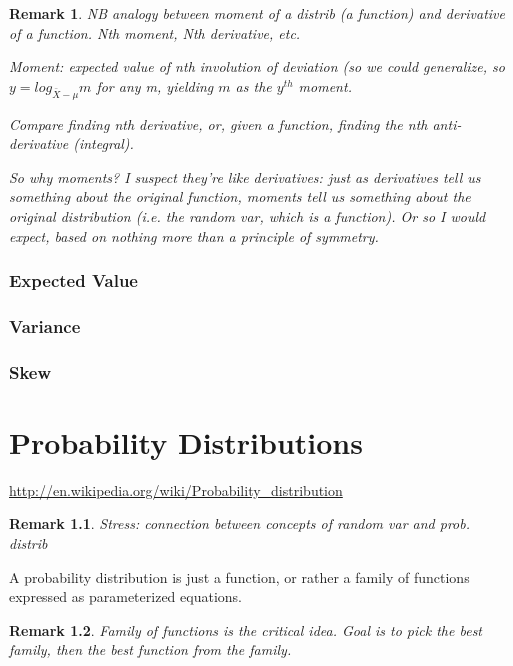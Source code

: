 \documentclass[reqno,12pt]{tufte-book}
\numberwithin{equation}{subsection}
\newtheorem{remark}{Remark}
\begin{document}
\begin{remark}
  NB analogy between moment of a distrib (a function) and derivative
  of a function.  Nth moment, Nth derivative, etc.

  Moment: expected value of nth involution of deviation (so we could
  generalize, so $y = log_{\bar{X}-\mu} m$ for any m, yielding $m$ as
  the $y^{th}$ moment.

  Compare finding nth derivative, or, given a function, finding the
  nth anti-derivative (integral).

  So why moments?  I suspect they're like derivatives: just as
  derivatives tell us something about the original function, moments
  tell us something about the original distribution (i.e. the random
  var, which is a function).  Or so I would expect, based on nothing
  more than a principle of symmetry.
\end{remark}

\subsection{Expected Value}

\subsection{Variance}

\subsection{Skew}

\chapter{Probability Distributions}

\url{http://en.wikipedia.org/wiki/Probability_distribution}


\begin{remark}
  Stress: connection between concepts of random var and prob. distrib
\end{remark}

A probability distribution is just a function, or rather a family of
functions expressed as parameterized equations.

\begin{remark}
  Family of functions is the critical idea.  Goal is to pick the best
  family, then the best function from the family.
\end{remark}
\end{document}
